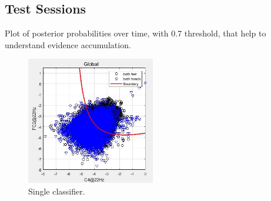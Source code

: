 \subsection{Test Sessions}\label{subsec:status}
Plot of posterior probabilities over time, with 0.7 threshold, that help to understand evidence accumulation.


\begin{figure}[h]
    \centering
    \includegraphics[width=0.5\textwidth]{Figure/GLOBAL_C.JPG}
    \caption{Single classifier.}
    \label{fig:Pipeline}
\end{figure}

